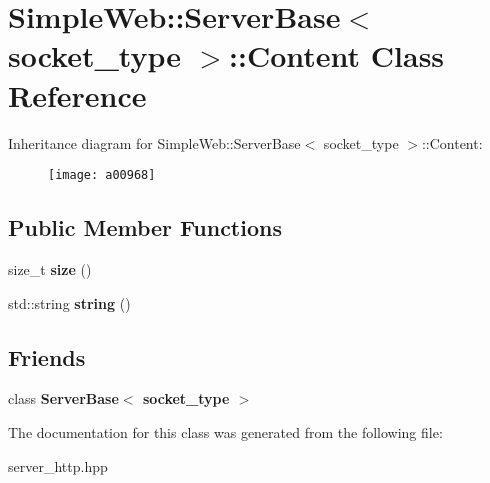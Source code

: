 \hypertarget{a00968}{}\section{Simple\+Web\+:\+:Server\+Base$<$ socket\+\_\+type $>$\+:\+:Content Class Reference}
\label{a00968}
Inheritance diagram for Simple\+Web\+:\+:Server\+Base$<$ socket\+\_\+type $>$\+:\+:Content\+:\begin{figure}[H]
\begin{center}
\leavevmode
\texttt{[image: a00968]}
\end{center}
\end{figure}
\subsection*{Public Member Functions}
\begin{DoxyCompactItemize}
\item 
\mbox{\label{a00968_adf8b2386c8ab32277341c6ae07cd4670}} 
size\+\_\+t {\bfseries size} ()
\item 
\mbox{\label{a00968_a6b4a72b0631c88ef576db28f54a768cb}} 
std\+::string {\bfseries string} ()
\end{DoxyCompactItemize}
\subsection*{Friends}
\begin{DoxyCompactItemize}
\item 
\mbox{\label{a00968_a01d54a7e16ca437c98ec571deca98dfc}} 
class {\bfseries Server\+Base$<$ socket\+\_\+type $>$}
\end{DoxyCompactItemize}


The documentation for this class was generated from the following file\+:\begin{DoxyCompactItemize}
\item 
server\+\_\+http.\+hpp\end{DoxyCompactItemize}
